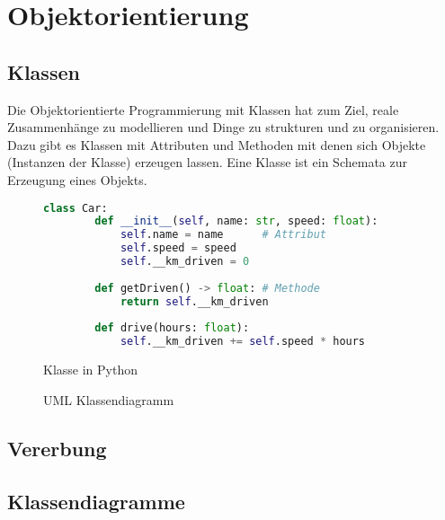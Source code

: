 \section{Objektorientierung}
\subsection{Klassen}

Die Objektorientierte Programmierung mit Klassen hat zum Ziel,
reale Zusammenhänge zu modellieren und Dinge zu strukturen und
zu organisieren. Dazu gibt es Klassen mit Attributen und Methoden
mit denen sich Objekte (Instanzen der Klasse) erzeugen lassen.
Eine Klasse ist ein Schemata zur Erzeugung eines Objekts.


\vspace*{0.5cm}
\begin{figure}[H]
\begin{center}
\hspace*{-2cm}
\begin{minipage}{.7\textwidth}
    \begin{lstlisting}[language=python]
    class Car:
        def __init__(self, name: str, speed: float):
            self.name = name      # Attribut
            self.speed = speed
            self.__km_driven = 0
            
        def getDriven() -> float: # Methode
            return self.__km_driven
            
        def drive(hours: float):
            self.__km_driven += self.speed * hours
    \end{lstlisting}
    \caption{Klasse in Python}
\end{minipage}
\begin{minipage}{.3\textwidth}
    \caption{UML Klassendiagramm}
\end{minipage}
\end{center}
\end{figure}

\subsection{Vererbung}
\subsection{Klassendiagramme}